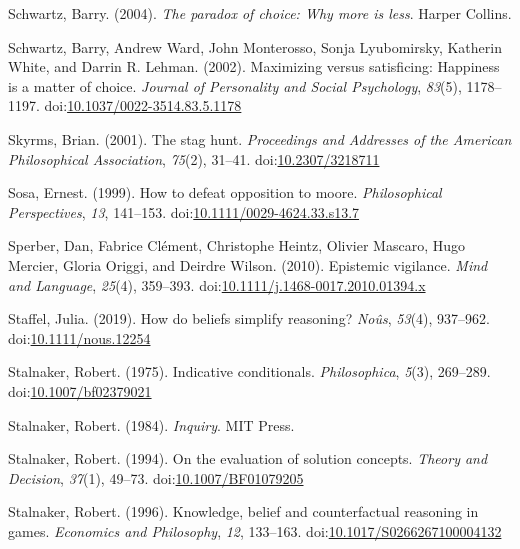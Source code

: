 \documentclass[
  10pt,
  letterpaper,
  twoside]{scrbook}
\newlength{\cslhangindent}
\newenvironment{CSLReferences}[2] %
 {\begin{list}{}{%
  \setlength{\itemindent}{0pt}
  \setlength{\leftmargin}{0pt}
  \setlength{\parsep}{0pt}
  \ifodd #1
   \setlength{\leftmargin}{\cslhangindent}
   \setlength{\itemindent}{-1\cslhangindent}
  \fi
  \setlength{\itemsep}{#2\baselineskip}}}
 {\end{list}}
\begin{document}
\begin{CSLReferences}{1}{0}
Schwartz, Barry. (2004). \emph{The paradox of choice: Why more is less}.
Harper Collins.

Schwartz, Barry, Andrew Ward, John Monterosso, Sonja Lyubomirsky,
Katherin White, and Darrin R. Lehman. (2002). Maximizing versus
satisficing: Happiness is a matter of choice. \emph{Journal of
Personality and Social Psychology}, \emph{83}(5), 1178--1197.
doi:\href{https://doi.org/10.1037/0022-3514.83.5.1178}{10.1037/0022-3514.83.5.1178}

Skyrms, Brian. (2001). The stag hunt. \emph{Proceedings and Addresses of
the American Philosophical Association}, \emph{75}(2), 31--41.
doi:\href{https://doi.org/10.2307/3218711}{10.2307/3218711}

Sosa, Ernest. (1999). How to defeat opposition to moore.
\emph{Philosophical Perspectives}, \emph{13}, 141--153.
doi:\href{https://doi.org/10.1111/0029-4624.33.s13.7}{10.1111/0029-4624.33.s13.7}

Sperber, Dan, Fabrice Clément, Christophe Heintz, Olivier Mascaro, Hugo
Mercier, Gloria Origgi, and Deirdre Wilson. (2010). Epistemic vigilance.
\emph{Mind and Language}, \emph{25}(4), 359--393.
doi:\href{https://doi.org/10.1111/j.1468-0017.2010.01394.x}{10.1111/j.1468-0017.2010.01394.x}

Staffel, Julia. (2019). How do beliefs simplify reasoning?
\emph{No{û}s}, \emph{53}(4), 937--962.
doi:\href{https://doi.org/10.1111/nous.12254}{10.1111/nous.12254}

Stalnaker, Robert. (1975). Indicative conditionals. \emph{Philosophica},
\emph{5}(3), 269--289.
doi:\href{https://doi.org/10.1007/bf02379021}{10.1007/bf02379021}

Stalnaker, Robert. (1984). \emph{Inquiry}. MIT Press.

Stalnaker, Robert. (1994). On the evaluation of solution concepts.
\emph{Theory and Decision}, \emph{37}(1), 49--73.
doi:\href{https://doi.org/10.1007/BF01079205}{10.1007/BF01079205}

Stalnaker, Robert. (1996). Knowledge, belief and counterfactual
reasoning in games. \emph{Economics and Philosophy}, \emph{12},
133--163.
doi:\href{https://doi.org/10.1017/S0266267100004132}{10.1017/S0266267100004132}


\end{CSLReferences}
\end{document}
